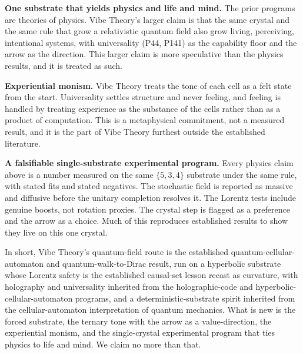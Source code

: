 \textbf{One substrate that yields physics and life and mind.} The prior programs are theories of physics. Vibe
Theory's larger claim is that the same crystal and the same rule that grow a relativistic quantum field also
grow living, perceiving, intentional systems, with universality (P44, P141) as the capability floor and the
arrow as the direction. This larger claim is more speculative than the physics results, and it is treated as
such.

\textbf{Experiential monism.} Vibe Theory treats the tone of each cell as a felt state from the start.
Universality settles structure and never feeling, and feeling is handled by treating experience as the
substance of the cells rather than as a product of computation. This is a metaphysical commitment, not a
measured result, and it is the part of Vibe Theory furthest outside the established literature.

\textbf{A falsifiable single-substrate experimental program.} Every physics claim above is a number measured
on the same $\{5,3,4\}$ substrate under the same rule, with stated fits and stated negatives. The stochastic
field is reported as massive and diffusive before the unitary completion resolves it. The Lorentz tests
include genuine boosts, not rotation proxies. The crystal step is flagged as a preference and the arrow as a
choice. Much of this reproduces established results to show they live on this one crystal.

In short, Vibe Theory's quantum-field route is the established quantum-cellular-automaton and
quantum-walk-to-Dirac result, run on a hyperbolic substrate whose Lorentz safety is the established
causal-set lesson recast as curvature, with holography and universality inherited from the holographic-code
and hyperbolic-cellular-automaton programs, and a deterministic-substrate spirit inherited from the
cellular-automaton interpretation of quantum mechanics. What is new is the forced substrate, the ternary tone
with the arrow as a value-direction, the experiential monism, and the single-crystal experimental program
that ties physics to life and mind. We claim no more than that.
